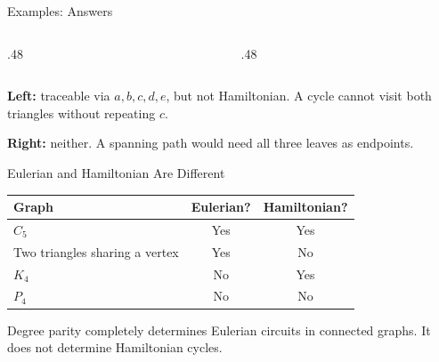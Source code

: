 \documentclass[aspectratio=169,11pt]{beamer}
\begin{document}
\begin{frame}{Examples: Answers}
\large
\begin{columns}[c,onlytextwidth]\begin{column}{.48\textwidth}\begin{center}\end{center}\end{column}\begin{column}{.48\textwidth}\begin{center}\end{center}\end{column}\end{columns}\textbf{Left:} traceable via $a,b,c,d,e$, but not Hamiltonian. A cycle cannot visit both triangles without repeating $c$.\par\medskip\textbf{Right:} neither. A spanning path would need all three leaves as endpoints.
\end{frame}

\begin{frame}{Eulerian and Hamiltonian Are Different}
\large
\renewcommand{\arraystretch}{1.5}\begin{tabular}{lcc}\toprule Graph & Eulerian? & Hamiltonian?\\\midrule $C_5$ & Yes & Yes\\Two triangles sharing a vertex & Yes & No\\$K_4$ & No & Yes\\$P_4$ & No & No\\\bottomrule\end{tabular}\par\bigskip Degree parity completely determines Eulerian circuits in connected graphs. It does not determine Hamiltonian cycles.
\end{frame}
\end{document}

